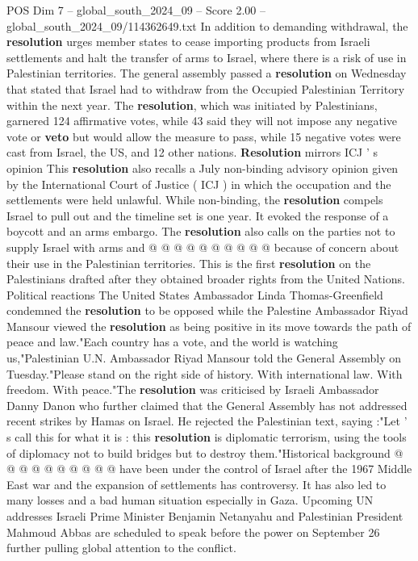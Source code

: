 \begin{textsample}{POS Dim 7 – global\_south\_2024\_09 – Score 2.00 – global\_south\_2024\_09/114362649.txt}  \label{ex:f7_pos_273}
In addition to demanding withdrawal, the \textbf{resolution} urges member states to cease importing products from Israeli settlements and halt the transfer of arms to Israel, where there is a risk of use in Palestinian territories.
The general assembly passed a \textbf{resolution} on Wednesday that stated that Israel had to withdraw from the Occupied Palestinian Territory within the next year.
The \textbf{resolution}, which was initiated by Palestinians, garnered 124 affirmative votes, while 43 said they will not impose any negative vote or \textbf{veto} but would allow the measure to pass, while 15 negative votes were cast from Israel, the US, and 12 other nations. \textbf{Resolution} mirrors ICJ ' s opinion This \textbf{resolution} also recalls a July non-binding advisory opinion given by the International Court of Justice ( ICJ ) in which the occupation and the settlements were held unlawful.
While non-binding, the \textbf{resolution} compels Israel to pull out and the timeline set is one year.
It evoked the response of a boycott and an arms embargo.
The \textbf{resolution} also calls on the parties not to supply Israel with arms and @ @ @ @ @ @ @ @ @ @ because of concern about their use in the Palestinian territories.
This is the first \textbf{resolution} on the Palestinians drafted after they obtained broader rights from the United Nations.
Political reactions The United States Ambassador Linda Thomas-Greenfield condemned the \textbf{resolution} to be opposed while the Palestine Ambassador Riyad Mansour viewed the \textbf{resolution} as being positive in its move towards the path of peace and law."Each country has a vote, and the world is watching us,"Palestinian U.N.
Ambassador Riyad Mansour told the General Assembly on Tuesday."Please stand on the right side of history.
With international law.
With freedom.
With peace."The \textbf{resolution} was criticised by Israeli Ambassador Danny Danon who further claimed that the General Assembly has not addressed recent strikes by Hamas on Israel.
He rejected the Palestinian text, saying :"Let ' s call this for what it is : this \textbf{resolution} is diplomatic terrorism, using the tools of diplomacy not to build bridges but to destroy them."Historical background @ @ @ @ @ @ @ @ @ @ have been under the control of Israel after the 1967 Middle East war and the expansion of settlements has controversy.
It has also led to many losses and a bad human situation especially in Gaza.
Upcoming UN addresses Israeli Prime Minister Benjamin Netanyahu and Palestinian President Mahmoud Abbas are scheduled to speak before the power on September 26 further pulling global attention to the conflict.

\end{textsample}
